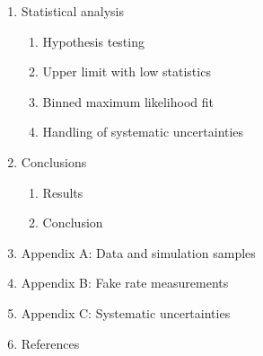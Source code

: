 \documentclass{article}
\begin{document}
\begin{enumerate}
\begin{enumerate}
        \end{enumerate}
    \item Statistical analysis
        \begin{enumerate}
            \item Hypothesis testing
            \item Upper limit with low statistics 
            \item Binned maximum likelihood fit 
            \item Handling of systematic uncertainties
        \end{enumerate}
    \item Conclusions
        \begin{enumerate}
            \item Results 
            \item Conclusion
        \end{enumerate}
    \item Appendix A: Data and simulation samples
    \item Appendix B: Fake rate measurements
    \item Appendix C: Systematic uncertainties
    \item References
\end{enumerate}
\end{document}
